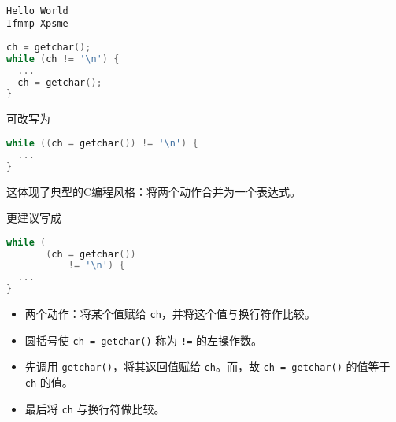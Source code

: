 \begin{frame}[fragile]
  \begin{minipage}{0.65\textwidth}
    
  \end{minipage}~~~\pause 
  \begin{minipage}{0.3\textwidth}
\begin{lstlisting}[backgroundcolor=\color{blue!20}]
Hello World
Ifmmp Xpsme
\end{lstlisting}    
  \end{minipage}

\end{frame}


\begin{frame}[fragile]
\begin{lstlisting}[language=c,frame=single]
ch = getchar();
while (ch != '\n') {
  ...
  ch = getchar();
}
\end{lstlisting} 
可改写为
\begin{lstlisting}[language=c,frame=single]
while ((ch = getchar()) != '\n') {
  ...   
}
\end{lstlisting} \pause \vspace{0.1in}

这体现了典型的C编程风格：将两个动作合并为一个表达式。
\end{frame}

\begin{frame}[fragile]
更建议写成
\begin{lstlisting}[language=c,frame=single]
while (
       (ch = getchar()) 
           != '\n') {
  ...   
}
\end{lstlisting}
\end{frame}

\begin{frame}[fragile]

\begin{itemize}
\item 两个动作：将某个值赋给 \lstinline|ch|，并将这个值与换行符作比较。\\[0.1in]
\item 圆括号使 \lstinline|ch = getchar()| 称为 \lstinline|!=| 的左操作数。\\[0.1in]
\item 先调用 \lstinline|getchar()|，将其返回值赋给 \lstinline|ch|。而，故 \lstinline|ch = getchar()| 的值等于 \lstinline|ch| 的值。\\[0.1in]
\item 最后将 \lstinline|ch| 与换行符做比较。
\end{itemize}
\end{frame}

